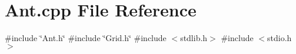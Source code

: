 \section{Ant.\+cpp File Reference}
\label{Ant_8cpp}
{\ttfamily \#include \char`\"{}Ant.\+h\char`\"{}}\newline
{\ttfamily \#include \char`\"{}Grid.\+h\char`\"{}}\newline
{\ttfamily \#include $<$stdlib.\+h$>$}\newline
{\ttfamily \#include $<$stdio.\+h$>$}\newline
